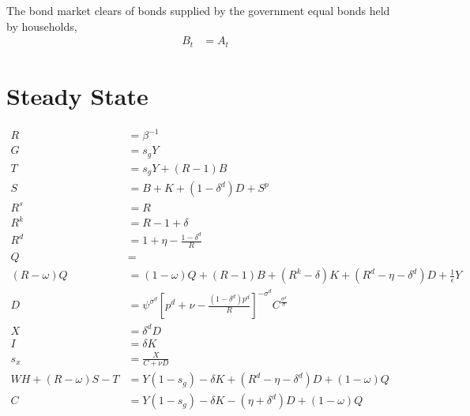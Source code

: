 \documentclass[11pt]{article}
\begin{document}
The bond market clears of bonds supplied by the government equal bonds held by households,
\begin{align}
    B_t &= A_t
\end{align}



\section{Steady State}


\begin{align*}
	R &= \beta^{-1} \\
	G &= s_g Y \\
	T &= s_g Y + (R-1)B \\
	S &= B + K + (1 - \delta^d) D + S^p \\
	R^s&= R \\
	R^k&=R-1+\delta \\
	R^d&=1+\eta -\frac{1-\delta^d}{R} \\
	Q &= \\
	(R-\omega)Q &= (1-\omega)Q + (R-1)B + (R^k - \delta) K + (R^d - \eta - \delta^d)D +\frac{1}{\epsilon}Y  \\
	D&=\psi^{\sigma^d} \left[p^d + \nu - \frac{(1-\delta^d) p^d}{R} \right]^{-\sigma^d} C^{\frac{\sigma^d}{\sigma}} \\
	X &= \delta^d D \\
	I &= \delta K \\
	s_x &= \frac{X}{C+ \nu D} \\
	WH +(R-\omega)S - T &= Y(1-s_g) - \delta K + (R^d - \eta - \delta^d)D + (1-\omega)Q  \\
	C   &= Y(1-s_g)  - \delta K  - (\eta + \delta^d)D + (1-\omega)Q
\end{align*}
\end{document}
